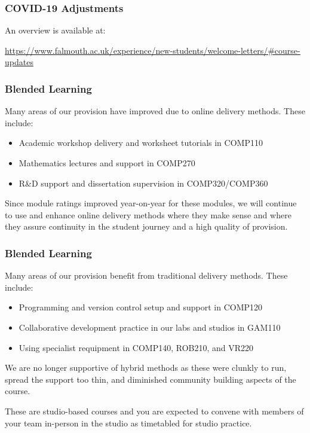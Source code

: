 \begin{frame}
	\frametitle{COVID-19 Adjustments}
		
	An overview is available at: 
	
	\vspace{0.5em}
	
	\url{https://www.falmouth.ac.uk/experience/new-students/welcome-letters/\#course-updates}
	
\end{frame}

\begin{frame}
	\frametitle{Blended Learning}
		
	Many areas of our provision have improved due to online delivery methods. These include:
	
	\vspace{0.5em}
	
	\begin{itemize}
		\item Academic workshop delivery and worksheet tutorials in COMP110
		\item Mathematics lectures and support in COMP270
		\item R\&D support and dissertation supervision in COMP320/COMP360
	\end{itemize}
	
	\vspace{0.5em}
	
	Since module ratings improved year-on-year for these modules, we will continue to use and enhance online delivery methods where they make sense and where they assure continuity in the student journey and a high quality of provision.
	
\end{frame}

\begin{frame}
	\frametitle{Blended Learning}
		
	Many areas of our provision benefit from traditional delivery methods. These include:
	
	\vspace{0.5em}
	
	\begin{itemize}
		\item Programming and version control setup and support in COMP120
		\item Collaborative development practice in our labs and studios in GAM110
		\item Using specialist requipment in COMP140, ROB210, and VR220
	\end{itemize}
	
	\vspace{0.5em}
	
	We are no longer supportive of hybrid methods as these were clunkly to run, spread the support too thin, and diminished community building aspects of the course.
	
	These are studio-based courses and you are expected to convene with members of your team in-person in the studio as timetabled for studio practice.
	
\end{frame}

